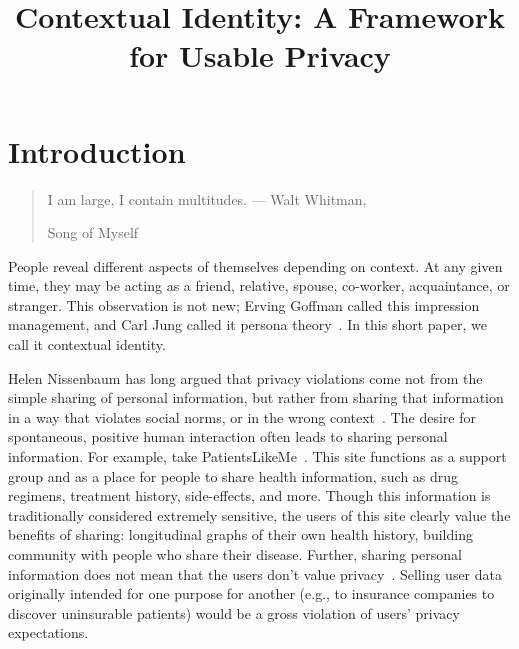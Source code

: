 \documentclass[10pt, conference, compsocconf]{IEEEtran}
\begin{document}
\title{Contextual Identity: A Framework for Usable Privacy}

\maketitle
\section{Introduction}
\begin{quote}I am large, I contain multitudes. --- Walt Whitman,
\begin{em}Song of Myself\end{em} \end{quote}

People reveal different aspects of themselves depending on context. At any
given time, they may be acting as a friend, relative, spouse, co-worker,
acquaintance, or stranger. This observation is not new; Erving Goffman called
this impression management, and Carl Jung called it persona
theory~\cite{goffman,jung}. In this short paper, we call it contextual identity.

Helen Nissenbaum has long argued that privacy violations come not from the
simple sharing of personal information, but rather from sharing that
information in a way that violates social norms, or in the wrong
context~\cite{nissenbaum}. The desire for spontaneous, positive human
interaction often leads to sharing personal information. For example, take
PatientsLikeMe~\cite{patientslikeme}. This site functions as a support group
and as a place for people to share health information, such as drug regimens,
treatment history, side-effects, and more. Though this information is
traditionally considered extremely sensitive, the users of this site clearly
value the benefits of sharing: longitudinal graphs of their own health history,
building community with people who share their disease. Further, sharing
personal information does not mean that the users don't value
privacy~\cite{boyd2}. Selling user data originally intended for one purpose for
another (e.g., to insurance companies to discover uninsurable patients) would
be a gross violation of users' privacy expectations.

\end{document}
